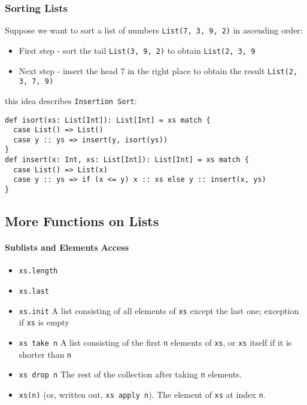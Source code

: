 \documentclass{scrartcl}
\newcommand{\term}[1]{\verb~#1~} %
\begin{document}
\subsubsection{Sorting Lists}
\label{sec:SortingLists}

Suppose we want to sort a list of numbers \lstinline|List(7, 3, 9, 2)| in
ascending order: 
\begin{itemize}
\item First step - sort the tail \lstinline|List(3, 9, 2)| to obtain
  \lstinline|List(2, 3, 9|
\item Next step - insert the head 7 in the right place to obtain the result
  \lstinline|List(2, 3, 7, 9)| 
\end{itemize}
this idea describes \term{Insertion Sort}:
\begin{lstlisting}
def isort(xs: List[Int]): List[Int] = xs match {
  case List() => List()
  case y :: ys => insert(y, isort(ys))
}
def insert(x: Int, xs: List[Int]): List[Int] = xs match {
  case List() => List(x)
  case y :: ys => if (x <= y) x :: xs else y :: insert(x, ys)
}
\end{lstlisting}

\subsection{More Functions on Lists}
\label{sec:MoreFunctionsOnLists}

\paragraph{Sublists and Elements Access}
\begin{itemize}
\item \lstinline|xs.length|
\item \lstinline|xs.last|
\item \lstinline|xs.init| A list consisting of all elements of \lstinline|xs|
  except the last one; exception if \lstinline|xs| is empty
\item \lstinline|xs take n| A list consisting of the first \lstinline|n|
  elements of \lstinline|xs|, or \lstinline|xs| itself if it is shorter than
  \lstinline|n| 
\item \lstinline|xs drop n| The rest of the collection after taking
  \lstinline|n| elements.
\item \lstinline|xs(n)| (or, written out, \lstinline|xs apply n|). The element
  of \lstinline|xs| at index \lstinline|n|.
\end{itemize}
\end{document}
